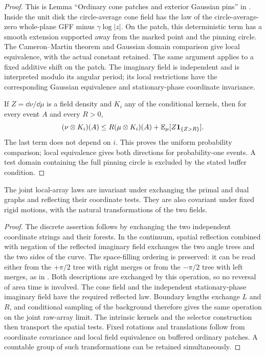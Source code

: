 \begin{proof}
This is Lemma ``Ordinary cone patches and exterior Gaussian pins''
in \cite{MetricMaps}.  Inside the unit disk the circle-average
cone field has the law of the circle-average-zero whole-plane
GFF minus $\gamma\log|z|$.  On the patch, this deterministic
term has a smooth extension supported away from the marked
point and the pinning circle.  The Cameron--Martin theorem
and Gaussian domain comparison give local equivalence, with
the actual constant retained.  The same argument applies to
a fixed additive shift on the patch.  The imaginary field is
independent and is interpreted modulo its angular period;
its local restrictions have the corresponding Gaussian
equivalence and stationary-phase coordinate invariance.

If $Z=\dd\nu/\dd\mu$ is a field density and $K_i$ any of the
conditional kernels, then for every event $A$ and every $R>0$,
\begin{equation}\label{inp:density-truncation}
 (\nu\otimes K_i)(A)
 \le R(\mu\otimes K_i)(A)
      +\mathbb E_\mu[Z\mathbf 1_{\{Z>R\}}].
\end{equation}
The last term does not depend on $i$.  This proves the uniform
probability comparison; local equivalence gives both directions
for probability-one events.  A test domain containing the full
pinning circle is excluded by the stated buffer condition.
\end{proof}

\begin{lemma}\label{inp:reflection}
The joint local-array laws are invariant under exchanging the
primal and dual graphs and reflecting their coordinate tests.
They are also covariant under fixed rigid motions, with the
natural transformations of the two fields.
\end{lemma}

\begin{proof}
The discrete assertion follows by exchanging the two independent
coordinate strings and their forests.  In the continuum,
spatial reflection combined with negation of the reflected
imaginary field exchanges the two angle trees and the two
sides of the curve.  The space-filling ordering is preserved:
it can be read either from the $+\pi/2$ tree with right merges
or from the $-\pi/2$ tree with left merges, as in
\cite[Section~1.2.3, Figure~1.16]{IG4}.  Both descriptions are
exchanged by this operation, so no reversal of area time is
involved.  The cone field and the independent stationary-phase
imaginary field have the required reflected law.  Boundary
lengths exchange $L$ and $R$, and conditional sampling of the
background therefore gives the same operation on the joint
raw-array limit.  The intrinsic kernels and the selector
construction then transport the spatial tests.  Fixed rotations
and translations follow from coordinate covariance and local
field equivalence on buffered ordinary patches.  A countable
group of such transformations can be retained simultaneously.
\end{proof}

